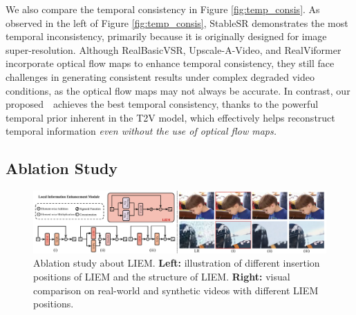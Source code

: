 We also compare the temporal consistency in Figure \ref{fig:temp_consis}. As observed in the left of Figure \ref{fig:temp_consis}, StableSR demonstrates the most temporal inconsistency, primarily because it is originally designed for image super-resolution. Although RealBasicVSR, Upscale-A-Video, and RealViformer incorporate optical flow maps to enhance temporal consistency, they still face challenges in generating consistent results under complex degraded video conditions, as the optical flow maps may not always be accurate. In contrast, our proposed~\name~achieves the best temporal consistency, thanks to the powerful temporal prior inherent in the T2V model, which effectively helps reconstruct temporal information \textit{even without the use of optical flow maps.}




\subsection{Ablation Study}

\begin{figure}
    \centering
    \includegraphics[width=\linewidth]{figure/liem_ablation.pdf}
    \caption{Ablation study about LIEM. \textbf{Left:} illustration of different insertion positions of LIEM and the structure of LIEM. \textbf{Right:} visual comparison on real-world and synthetic videos with different LIEM positions.}
    \label{fig:liem_ablation}
\end{figure}

\begin{table}[t]
    \centering
    \caption{Ablation of LIEM position.}
    \label{tab:position_ablation}
\end{table}

